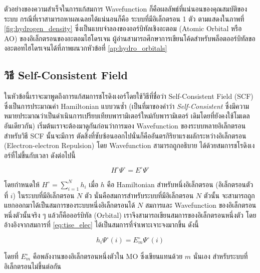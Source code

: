 ตัวอย่างของความสำเร็จในการแก้สมการ Wavefunction ก็คือผลลัพธ์ที่แน่นอนของคุณสมบัติของระบบ กรณีที่เราสามารถหาผลเฉลยได้แน่นอนก็คือ%
ระบบที่มีอิเล็กตรอน 1 ตัว ตามแสดงในภาพที่ \ref{fig:hydrogen_density} ซึ่งเป็นแบบจำลองของออร์บิทัลเชิงอะตอม (Atomic Orbital 
หรือ AO) ของอิเล็กตรอนของอะตอมไฮโดรเจน ผู้อ่านสามารถศึกษาการเขียนโค้ดสำหรับพล็อตออร์บิทัลของอะตอทไฮโดรเจนได้ที่ภาพผนวกหัวข้อที่ 
\ref{ap:hydro_orbitals}

\subsection{วิธี Self-Consistent Field}
\label{ssec:scf}

ในหัวข้อนี้เราจะมาพูดถึงการแก้สมการชโรดิงเงอร์โดยใช้วิธีที่ชื่อว่า Self-Consistent Field (SCF) ซึ่งเป็นการประมาณค่า Hamiltonian 
แบบวนซ้ำ (เป็นที่มาของคำว่า \textit{Self-Consistent} ซึ่งมีความหมายประมาณว่าเป็นดำเนินการเปรียบเทียบพารามิเตอร์ใหม่กับพารามิเตอร์%
เดิมโดยที่ยังคงใช้โมเดลอันเดียวกัน) เริ่มต้นเราจะต้องมาดูกันก่อนว่าการมอง Wavefunction ของระบบหลายอิเล็กตรอนสำหรับวิธี SCF นั้นจะมีการ%
ตัดสิ่งที่ซับซ้อนออกไปนั่นก็คืออันตรกิริยาแรงผลักระหว่างอิเล็กตรอน (Electron-electron Repulsion) โดย Wavefunction สามารถถูกอธิบาย%
ได้ด้วยสมการชโรดิงเงอร์ที่ไม่ขึ้นกับเวลา ดังต่อไปนี้\autocite{cramer2004}

\begin{equation}\label{eq:tise_elec}
    H^{\circ} \Psi^{\circ} = E^{\circ} \Psi^{\circ}
\end{equation}

โดยกำหนดให้ $H^{\circ} = \sum^{N}_{i=1} h_{i}$ เมื่อ $h$ คือ Hamiltonian สำหรับหนึ่งอิเล็กตรอน (อิเล็กตรอนตัวที่ $i$) 
ในระบบที่มีอิเล็กตรอน $N$ ตัว นั่นคือสมการสำหรับระบบที่มีอิเล็กตรอน $N$ ตัวนั้น จะสามารถถูกแยกออกมาได้เป็นสมการของระบบหนึ่งอิเล็กตรอนได้ 
$N$ สมการและ Wavefunction ของอิเล็กตรอนหนึ่งตัวนั้นจริง ๆ แล้วก็คือออร์บิทัล (Orbital) เราจึงสามารถเขียนสมการของอิเล็กตรอนหนึ่งตัว%
โดยอ้างอิงจากสมการที่ \ref{eq:tise_elec} ได้เป็นสมการที่จำเพาะเจาะจงมากขึ้น ดังนี้

\begin{equation}\label{eq:tise_elec_i}
    h_{i} \Psi^{\circ}(i) = E^{\circ}_{m} \Psi^{\circ}(i)
\end{equation}

\noindent โดยที่ $E^{\circ}_{m}$ คือพลังงานของอิเล็กตรอนหนึ่งตัวใน MO ซึ่งเขียนแทนด้วย $m$ นั่นเอง สำหรับระบบที่อิเล็กตรอนไม่ขึ้นต่อกัน

